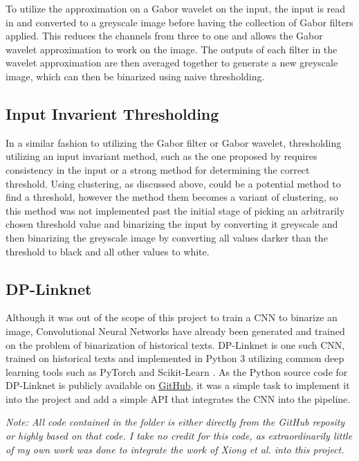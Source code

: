 To utilize the approximation on a Gabor wavelet on the input, the input is read in and converted to a greyscale image before having the collection of Gabor filters applied. This reduces the channels from three to one and allows the Gabor wavelet approximation to work on the image. The outputs of each filter in the wavelet approximation are then averaged together to generate a new greyscale image, which can then be binarized using naive thresholding.

\subsection{Input Invarient Thresholding}

In a similar fashion to utilizing the Gabor filter or Gabor wavelet, thresholding utilizing an input invariant method, such as the one proposed by \cite{Bar-Yosef2005, Bar-Yosef2007} requires consistency in the input or a strong method for determining the correct threshold. Using clustering, as discussed above, could be a potential method to find a threshold, however the method them becomes a variant of clustering, so this method was not implemented past the initial stage of picking an arbitrarily chosen threshold value and binarizing the input by converting it greyscale and then binarizing the greyscale image by converting all values darker than the threshold to black and all other values to white.

\subsection{DP-Linknet}

Although it was out of the scope of this project to train a CNN to binarize an image, Convolutional Neural Networks have already been generated and trained on the problem of binarization of historical texts. DP-Linknet \cite{Xiong} is one such CNN, trained on historical texts and implemented in Python 3 utilizing common deep learning tools such as PyTorch \cite{PyTorch} and Scikit-Learn \cite{Scikit}. As the Python source code for DP-Linknet is publicly available on \href{https://github.com/beargolden/DP-LinkNet}{GitHub}, it was a simple task to implement it into the project and add a simple API that integrates the CNN into the pipeline.

\textit{Note: All code contained in the}  \textit{folder is either directly from the GitHub reposity or highly based on that code. I take no credit for this code, as extraordinarily little of my own work was done to integrate the work of Xiong et al. into this project.}

